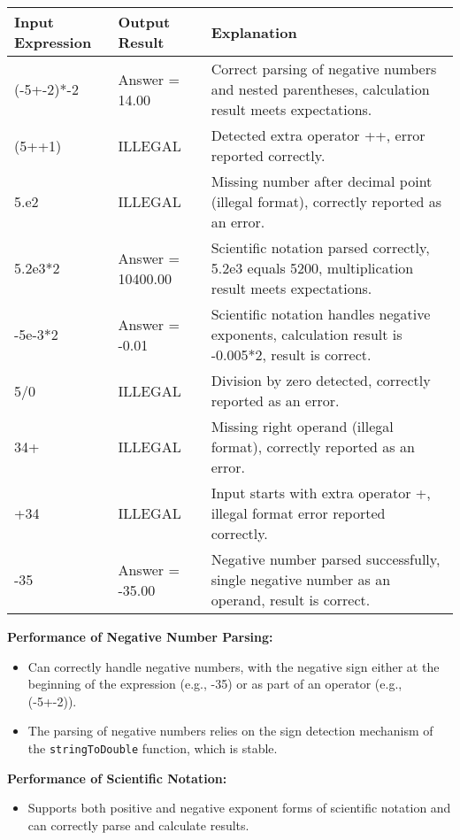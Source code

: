 \documentclass{article}
\begin{document}
\begin{center}
\begin{tabular}{|p{}|p{}|p{}|}
\hline
\textbf{Input Expression} & \textbf{Output Result} & \textbf{Explanation} \\
\hline
(-5+-2)*-2 & Answer = 14.00 & Correct parsing of negative numbers and nested parentheses, calculation result meets expectations. \\
\hline
(5++1) & ILLEGAL & Detected extra operator ++, error reported correctly. \\
\hline
5.e2 & ILLEGAL & Missing number after decimal point (illegal format), correctly reported as an error. \\
\hline
5.2e3*2 & Answer = 10400.00 & Scientific notation parsed correctly, 5.2e3 equals 5200, multiplication result meets expectations. \\
\hline
-5e-3*2 & Answer = -0.01 & Scientific notation handles negative exponents, calculation result is -0.005*2, result is correct. \\
\hline
5/0 & ILLEGAL & Division by zero detected, correctly reported as an error. \\
\hline
34+ & ILLEGAL & Missing right operand (illegal format), correctly reported as an error. \\
\hline
+34 & ILLEGAL & Input starts with extra operator +, illegal format error reported correctly. \\
\hline
-35 & Answer = -35.00 & Negative number parsed successfully, single negative number as an operand, result is correct. \\
\hline
\end{tabular}
\end{center}

\textbf{Performance of Negative Number Parsing:}
\begin{itemize}
    \item Can correctly handle negative numbers, with the negative sign either at the beginning of the expression (e.g., -35) or as part of an operator (e.g., (-5+-2)).
    \item The parsing of negative numbers relies on the sign detection mechanism of the \texttt{stringToDouble} function, which is stable.
\end{itemize}

\textbf{Performance of Scientific Notation:}
\begin{itemize}
    \item Supports both positive and negative exponent forms of scientific notation and can correctly parse and calculate results.
\end{itemize}
\end{document}
